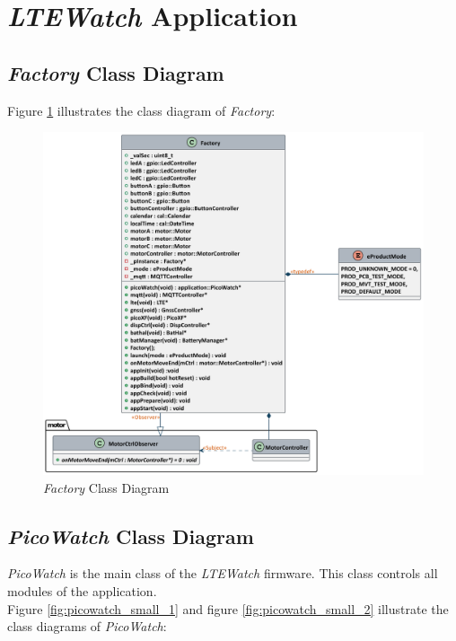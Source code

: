 \documentclass[report.tex]{subfiles}
\begin{document}
\pagebreak

\section{\textit{LTEWatch} Application}
\subsection{\textit{Factory} Class Diagram}

Figure \ref{fig:factory} illustrates the class diagram of \textit{Factory}: 

\begin{figure}[H]
	\centering
	\includegraphics[width=1\textwidth]{Include/Figure/software/class/factory.pdf}
	\caption{\textit{Factory} Class Diagram}
	\label{fig:factory}
\end{figure}


\pagebreak

\subsection{\textit{PicoWatch} Class Diagram}
\textit{PicoWatch} is the main class of the \textit{LTEWatch} firmware. This class controls all modules of the application.\\

Figure \ref{fig:picowatch_small_1} and figure \ref{fig:picowatch_small_2} illustrate the class diagrams of \textit{PicoWatch}: 
\end{document}
